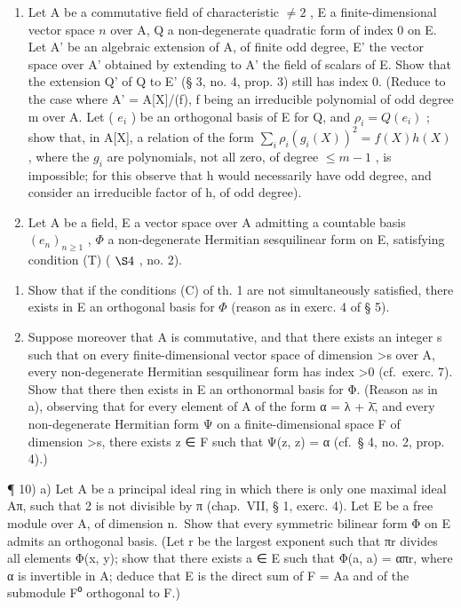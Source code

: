 \begin{enumerate}
\def\labelenumi{\arabic{enumi})}
\setcounter{enumi}{7}
\item
  Let A be a commutative field of characteristic \(\neq 2\) , E a finite-dimensional vector space \(n\) over A, Q a non-degenerate quadratic form of index 0 on E. Let A' be an algebraic extension of A, of finite odd degree, E' the vector space over A' obtained by extending to A' the field of scalars of E. Show that the extension Q' of Q to E' (§ 3, no. 4, prop. 3) still has index 0. (Reduce to the case where A' = A{[}X{]}/(f), f being an irreducible polynomial of odd degree m over A. Let ( \(e_i\) ) be an orthogonal basis of E for Q, and \(\rho_i = Q(e_i)\) ; show that, in A{[}X{]}, a relation of the form \(\sum_{i} \rho_i(g_i(X))^2 = f(X)h(X)\) , where the \(g_i\) are polynomials, not all zero, of degree \(\leqslant m - 1\) , is impossible; for this observe that h would necessarily have odd degree, and consider an irreducible factor of h, of odd degree).
\item
  Let A be a field, E a vector space over A admitting a countable basis \((e_n)_{n\geqslant 1}\) , \(\Phi\) a non-degenerate Hermitian sesquilinear form on E, satisfying condition (T) ( \(\S 4\) , no. 2).
\end{enumerate}

\begin{enumerate}
\def\labelenumi{\alph{enumi})}
\item
  Show that if the conditions (C) of th. 1 are not simultaneously satisfied, there exists in E an orthogonal basis for \(\Phi\) (reason as in exerc. 4 of § 5).
\item
  Suppose moreover that A is commutative, and that there exists an integer s such that on every finite-dimensional vector space of dimension \textgreater s over A, every non-degenerate Hermitian sesquilinear form has index \textgreater0 (cf.~exerc. 7). Show that there then exists in E an orthonormal basis for Φ. (Reason as in a), observing that for every element of A of the form α = λ + λ̄, and every non-degenerate Hermitian form Ψ on a finite-dimensional space F of dimension \textgreater s, there exists z ∈ F such that Ψ(z, z) = α (cf.~§ 4, no. 2, prop. 4).)
\end{enumerate}

¶ 10) a) Let A be a principal ideal ring in which there is only one maximal ideal Aπ, such that 2 is not divisible by π (chap.~VII, § 1, exerc. 4). Let E be a free module over A, of dimension n.~Show that every symmetric bilinear form Φ on E admits an orthogonal basis. (Let r be the largest exponent such that πr divides all elements Φ(x, y); show that there exists a ∈ E such that Φ(a, a) = απr, where α is invertible in A; deduce that E is the direct sum of F = Aa and of the submodule F⁰ orthogonal to F.)


